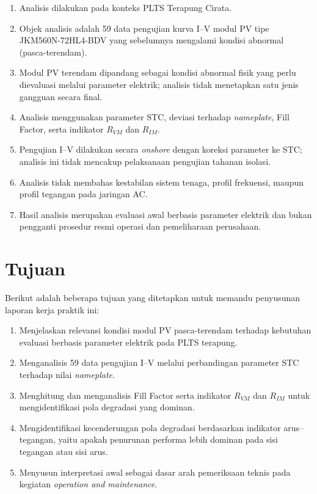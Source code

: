 \begin{enumerate}
    \item Analisis dilakukan pada konteks PLTS Terapung Cirata.
    \item Objek analisis adalah 59 data pengujian kurva I--V modul PV tipe
          JKM560N-72HL4-BDV yang sebelumnya mengalami kondisi abnormal
          (pasca-terendam).
    \item Modul PV terendam dipandang sebagai kondisi abnormal fisik yang perlu
          dievaluasi melalui parameter elektrik; analisis tidak menetapkan
          satu jenis gangguan secara final.
    \item Analisis menggunakan parameter STC, deviasi terhadap
          \textit{nameplate}, Fill Factor, serta indikator $R_{VM}$ dan
          $R_{IM}$.
    \item Pengujian I--V dilakukan secara \textit{onshore} dengan koreksi
          parameter ke STC; analisis ini tidak mencakup pelaksanaan pengujian
          tahanan isolasi.
    \item Analisis tidak membahas kestabilan sistem tenaga, profil frekuensi,
          maupun profil tegangan pada jaringan AC.
    \item Hasil analisis merupakan evaluasi awal berbasis parameter elektrik
          dan bukan pengganti prosedur resmi operasi dan pemeliharaan
          perusahaan.
\end{enumerate}

\section{Tujuan}

Berikut adalah beberapa tujuan yang ditetapkan untuk memandu penyusunan laporan
kerja praktik ini:

\begin{enumerate}
    \item Menjelaskan relevansi kondisi modul PV pasca-terendam terhadap
          kebutuhan evaluasi berbasis parameter elektrik pada PLTS terapung.
    \item Menganalisis 59 data pengujian I--V melalui perbandingan parameter
          STC terhadap nilai \textit{nameplate}.
    \item Menghitung dan menganalisis Fill Factor serta indikator $R_{VM}$ dan
          $R_{IM}$ untuk mengidentifikasi pola degradasi yang dominan.
    \item Mengidentifikasi kecenderungan pola degradasi berdasarkan indikator
          arus--tegangan, yaitu apakah penurunan performa lebih dominan pada
          sisi tegangan atau sisi arus.
    \item Menyusun interpretasi awal sebagai dasar arah pemeriksaan teknis
          pada kegiatan \textit{operation and maintenance}.
\end{enumerate}

